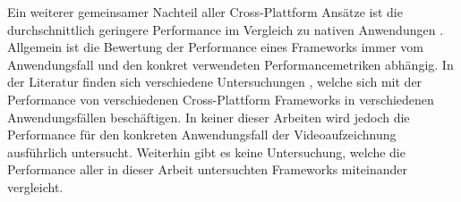 Ein weiterer gemeinsamer Nachteil aller Cross-Plattform Ansätze ist die durchschnittlich geringere Performance im Vergleich zu nativen Anwendungen \cite{Que_Comparison_Hybrid_Native, Pinto_Native_to_Cross_Platform}.
Allgemein ist die Bewertung der Performance eines Frameworks immer vom Anwendungsfall und den konkret verwendeten Performancemetriken abhängig.
In der Literatur finden sich verschiedene Untersuchungen \cite{Nawrocki_Comparison_Hybrid_Native_Frameworks,Biorn-Hansen_PerformanceOverhead_CrossPlatform}, welche sich mit der Performance von verschiedenen Cross-Plattform Frameworks in verschiedenen Anwendungsfällen beschäftigen.
In keiner dieser Arbeiten wird jedoch die Performance für den konkreten Anwendungsfall der Videoaufzeichnung ausführlich untersucht.
Weiterhin gibt es keine Untersuchung, welche die Performance aller in dieser Arbeit untersuchten Frameworks miteinander vergleicht.